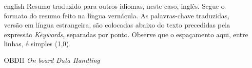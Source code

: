 \documentclass[
12pt,				%
oneside,			%
a4paper,			%
chapter=TITLE,		%
section=TITLE,		%
english,			%
brazil				%
hyperref=hidelinks]{abntex2}
\begin{document}
\begin{resumo}[Abstract]
    \begin{otherlanguage*}{english}
        Resumo traduzido para outros idiomas, neste caso, inglês. Segue o formato do resumo feito na língua vernácula. As palavras-chave traduzidas, versão em língua estrangeira, são colocadas abaixo do texto precedidas pela expressão \emph{Keywords}, separadas por ponto. Observe que o espaçamento aqui, entre linhas, é simples (1,0).
    \end{otherlanguage*}

\end{resumo}
\imprimirlistafiguras


\imprimirlistatabelas

\begin{siglas}
	\item[OBDH] \textit{On-board Data Handling} 
\end{siglas}


\imprimirsumario


\textual






\postextual
%
%
\end{document}
